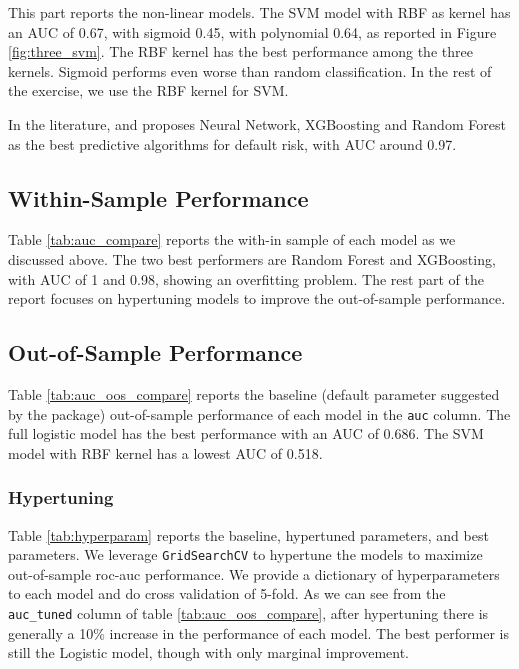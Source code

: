 \documentclass[10pt]{article} %
\begin{document}
    This part reports the non-linear models.
    The SVM model with RBF as kernel has an AUC of 0.67, with sigmoid 0.45, with polynomial 0.64, as reported in Figure \ref{fig:three_svm}. The RBF kernel has the best performance among the three kernels. Sigmoid performs even worse than random classification. In the rest of the exercise, we use the RBF kernel for SVM.

    In the literature, \cite{Bazzanaetal2023} and \cite{Wu2022} proposes Neural Network, XGBoosting and Random Forest as the best predictive algorithms for default risk, with AUC around 0.97.

    \subsection{Within-Sample Performance}
    
    Table \ref{tab:auc_compare} reports the with-in sample of each model as we discussed above. The two best performers are Random Forest and XGBoosting, with AUC of 1 and 0.98, showing an overfitting problem. The rest part of the report focuses on hypertuning models to improve the out-of-sample performance. 

    \subsection{Out-of-Sample Performance}
    
    Table \ref{tab:auc_oos_compare} reports the baseline (default parameter suggested by the package) out-of-sample performance of each model in the \texttt{auc} column. The full logistic model has the best performance with an AUC of 0.686. The SVM model with RBF kernel has a lowest AUC of 0.518. 

    \subsubsection{Hypertuning}
    
    Table \ref{tab:hyperparam} reports the baseline, hypertuned parameters, and best parameters. We leverage \texttt{GridSearchCV} to hypertune the models to maximize out-of-sample roc-auc performance. We provide a dictionary of hyperparameters to each model and do cross validation of 5-fold. As we can see from the \texttt{auc\_tuned} column of table \ref{tab:auc_oos_compare}, after hypertuning there is generally a 10\% increase in the performance of each model. The best performer is still the Logistic model, though with only marginal improvement.
    


\newpage
\footnotesize


\end{document}

